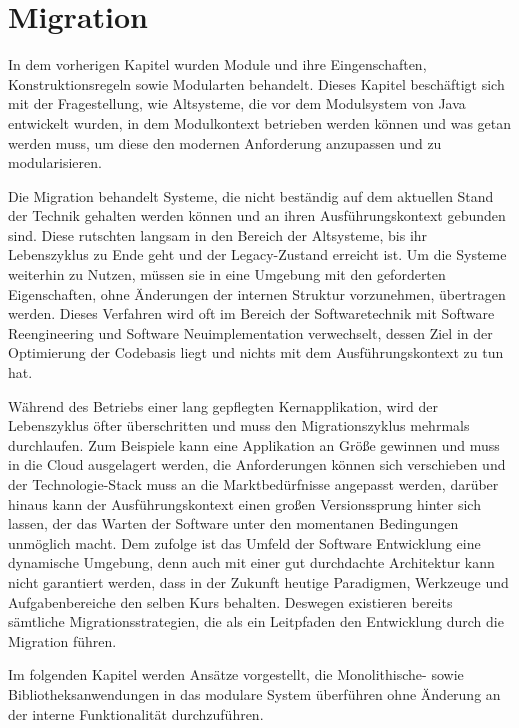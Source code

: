 \chapter{Migration}

	In dem vorherigen Kapitel wurden Module und ihre Eingenschaften, Konstruktionsregeln sowie Modularten behandelt. Dieses Kapitel beschäftigt sich mit der Fragestellung, wie Altsysteme, die vor dem Modulsystem von Java entwickelt wurden, in dem Modulkontext betrieben werden können und was getan werden muss, um diese den modernen Anforderung anzupassen und zu modularisieren.\bigbreak

	Die Migration behandelt Systeme, die nicht beständig auf dem aktuellen Stand der Technik gehalten werden können und an ihren Ausführungskontext gebunden sind. Diese rutschten langsam in den Bereich der Altsysteme, bis ihr Lebenszyklus zu Ende geht und der Legacy-Zustand erreicht ist. Um die Systeme weiterhin zu Nutzen, müssen sie in eine Umgebung mit den geforderten Eigenschaften, ohne Änderungen der internen Struktur vorzunehmen, übertragen werden. Dieses Verfahren wird oft im Bereich der Softwaretechnik mit Software Reengineering und Software Neuimplementation verwechselt, dessen Ziel in der Optimierung der Codebasis liegt und nichts mit dem Ausführungskontext zu tun hat. \cite{martens2016ablosung} \bigbreak

	Während des Betriebs einer lang gepflegten Kernapplikation, wird der Lebenszyklus öfter überschritten und muss den Migrationszyklus mehrmals durchlaufen. Zum Beispiele kann eine Applikation an Größe gewinnen und muss in die Cloud ausgelagert werden, die Anforderungen können sich verschieben und der Technologie-Stack muss an die Marktbedürfnisse angepasst werden, darüber hinaus kann der Ausführungskontext einen großen Versionssprung hinter sich lassen, der das Warten der Software unter den momentanen Bedingungen unmöglich macht. \newline
	Dem zufolge ist das Umfeld der Software Entwicklung eine dynamische Umgebung, denn auch mit einer gut durchdachte Architektur kann nicht garantiert werden, dass in der Zukunft heutige Paradigmen, Werkzeuge und Aufgabenbereiche den selben Kurs behalten. Deswegen existieren bereits sämtliche Migrationsstrategien, die als ein Leitpfaden den Entwicklung durch die Migration führen. \bigbreak

	Im folgenden Kapitel werden Ansätze vorgestellt, die Monolithische- sowie Bibliotheksanwendungen in das modulare System überführen ohne Änderung an der interne Funktionalität durchzuführen. 


